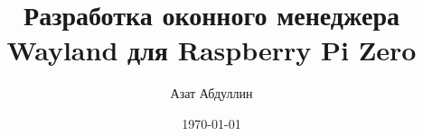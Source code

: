 
\title{Разработка оконного менеджера Wayland для Raspberry Pi Zero}

\author{Азат Абдуллин}


\date{\today}

